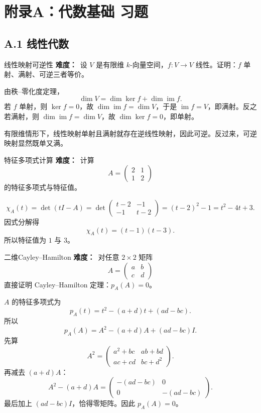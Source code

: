 \chapter{附录A：代数基础 习题}
\difficultykey

\section{A.1 线性代数}

\begin{problem}{线性映射可逆性}
\textbf{难度：}\easy\ 设 $V$ 是有限维 $k$-向量空间，$f:V\to V$ 线性。证明：$f$ 单射、满射、可逆三者等价。
\end{problem}
\begin{solution}
由秩--零化度定理，
\[
\dim V=\dim\ker f+\dim\operatorname{im}f.
\]
若 $f$ 单射，则 $\ker f=0$，故 $\dim\operatorname{im}f=\dim V$，于是 $\operatorname{im}f=V$，即满射。反之若满射，则 $\dim\operatorname{im}f=\dim V$，故 $\dim\ker f=0$，即单射。

有限维情形下，线性映射单射且满射就存在逆线性映射，因此可逆。反过来，可逆映射显然既单又满。
\end{solution}

\begin{problem}{特征多项式计算}
\textbf{难度：}\easy\ 计算
\[
A=\begin{pmatrix}2&1\\1&2\end{pmatrix}
\]
的特征多项式与特征值。
\end{problem}
\begin{solution}
\[
\chi_A(t)=\det(tI-A)=\det\begin{pmatrix}t-2&-1\\-1&t-2\end{pmatrix}=(t-2)^2-1=t^2-4t+3.
\]
因式分解得
\[
\chi_A(t)=(t-1)(t-3).
\]
所以特征值为 $1$ 与 $3$。
\end{solution}

\begin{problem}{二维Cayley--Hamilton}
\textbf{难度：}\medium\ 对任意 $2\times2$ 矩阵
\[
A=\begin{pmatrix}a&b\\c&d\end{pmatrix}
\]
直接证明 Cayley--Hamilton 定理：$p_A(A)=0$。
\end{problem}
\begin{solution}
$A$ 的特征多项式为
\[
p_A(t)=t^2-(a+d)t+(ad-bc).
\]
所以
\[
p_A(A)=A^2-(a+d)A+(ad-bc)I.
\]
先算
\[
A^2=\begin{pmatrix}a^2+bc&ab+bd\\ac+cd&bc+d^2\end{pmatrix}.
\]
再减去 $(a+d)A$：
\[
A^2-(a+d)A=
\begin{pmatrix}
-(ad-bc)&0\\0&-(ad-bc)
\end{pmatrix}.
\]
最后加上 $(ad-bc)I$，恰得零矩阵。因此 $p_A(A)=0$。
\end{solution}


